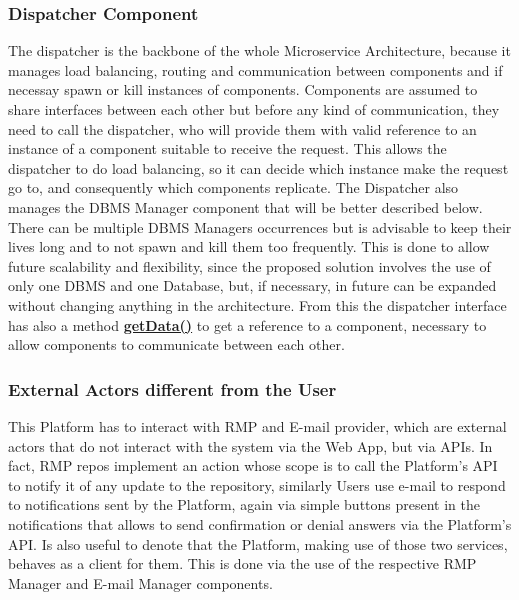 \subsubsection{Dispatcher Component} \label{parr:dispatcher}
The dispatcher is the backbone of the whole Microservice Architecture, because it manages load balancing, routing and communication between components and if necessay spawn or kill instances of components. 
Components are assumed to share interfaces between each other but before any kind of communication, they need to call the dispatcher, who will provide them with valid reference to an instance of a component suitable to receive the request.
This allows the dispatcher to do load balancing, so it can decide which instance make the request go to, and consequently which components replicate.
The Dispatcher also manages the DBMS Manager component that will be better described below. There can be multiple DBMS Managers occurrences but is advisable to keep their lives long and to not spawn and kill them too frequently. 
This is done to allow future scalability and flexibility, since the proposed solution involves the use of only one DBMS and one Database, but, if necessary, in future can be expanded without changing anything in the architecture.
From this the dispatcher interface has also a method \hyperref[meth:dispGetData]{\textbf{getData()}} to get a reference to a component, necessary to allow components to communicate between each other.

\subsubsection{External Actors different from the User} 
This Platform has to interact with RMP and E-mail provider, which are external actors that do not interact with the system via the Web App, but via APIs.
In fact, RMP repos implement an action whose scope is to call the Platform's API to notify it of any update to the repository, similarly Users use e-mail to respond to notifications sent by the Platform, again via simple buttons present in the notifications that allows to send confirmation or denial answers via the Platform's API.
Is also useful to denote that the Platform, making use of those two services, behaves as a client for them. This is done via the use of the respective RMP Manager and E-mail Manager components.

